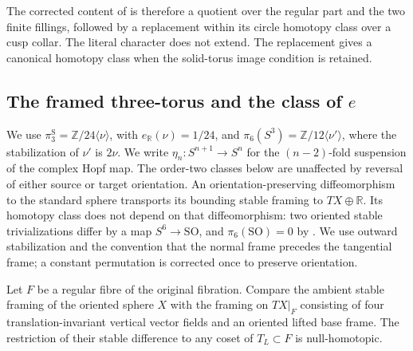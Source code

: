 The corrected content of \cite[Remark 8.3]{mapsEngel} is
therefore a quotient over the regular part and the two finite
fillings, followed by a replacement within its circle homotopy
class over a cusp collar.  The literal character does not
extend.  The replacement gives a canonical homotopy class
when the solid-torus image condition is retained.


\label{qa:III:layout:12}
\subsection{The framed three-torus and the class of \texorpdfstring{$e$}{e}}

We use $\pi_3^{\mathrm S}=\mathbb Z/24\langle\nu\rangle$, with
$e_{\mathbb R}(\nu)=1/24$, and
$\pi_6(S^3)=\mathbb Z/12\langle\nu'\rangle$, where the
stabilization of $\nu'$ is $2\nu$.  We write
$\eta_n:S^{n+1}\to S^n$ for the $(n-2)$-fold suspension of
the complex Hopf map.  The order-two classes below are
unaffected by reversal of either source or target orientation.
An orientation-preserving diffeomorphism to the standard sphere
transports its bounding stable framing to $TX\oplus\mathbb R$.
Its homotopy class does not depend on that diffeomorphism:
two oriented stable trivializations differ by a map
$S^6\to\mathrm{SO}$, and $\pi_6(\mathrm{SO})=0$
by \cite[Corollary to Theorem II and the table on p.~315]{mapsBott59}.
We use outward stabilization and the convention that the normal
frame precedes the tangential frame; a constant permutation is
corrected once to preserve orientation.

\begin{lemma}\label{maps:src:B.1.1}


Let $F$ be a regular fibre of the original fibration.  Compare
the ambient stable framing of the oriented sphere $X$ with
the framing on $TX|_F$ consisting of four translation-invariant
vertical vector fields and an oriented lifted base frame.
The restriction of their stable difference to any coset of
$T_L\subset F$ is null-homotopic.

\end{lemma}


